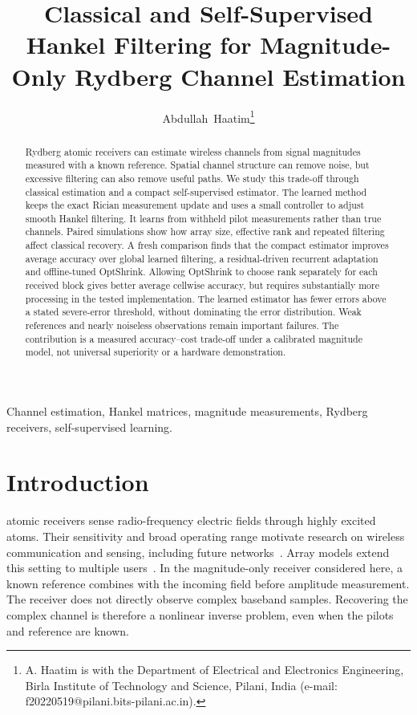 \documentclass[10pt,journal,letterpaper]{IEEEtran}
\begin{document}
\title{Classical and Self-Supervised Hankel Filtering for Magnitude-Only Rydberg Channel Estimation}
\author{Abdullah~Haatim\thanks{A. Haatim is with the Department of Electrical and Electronics Engineering, Birla Institute of Technology and Science, Pilani, India (e-mail: f20220519@pilani.bits-pilani.ac.in).}}
\maketitle
\begin{abstract}
Rydberg atomic receivers can estimate wireless channels from signal magnitudes measured with a known reference. Spatial channel structure can remove noise, but excessive filtering can also remove useful paths. We study this trade-off through classical estimation and a compact self-supervised estimator. The learned method keeps the exact Rician measurement update and uses a small controller to adjust smooth Hankel filtering. It learns from withheld pilot measurements rather than true channels. Paired simulations show how array size, effective rank and repeated filtering affect classical recovery. A fresh comparison finds that the compact estimator improves average accuracy over global learned filtering, a residual-driven recurrent adaptation and offline-tuned OptShrink. Allowing OptShrink to choose rank separately for each received block gives better average cellwise accuracy, but requires substantially more processing in the tested implementation. The learned estimator has fewer errors above a stated severe-error threshold, without dominating the error distribution. Weak references and nearly noiseless observations remain important failures. The contribution is a measured accuracy--cost trade-off under a calibrated magnitude model, not universal superiority or a hardware demonstration.
\end{abstract}
\begin{IEEEkeywords}
Channel estimation, Hankel matrices, magnitude measurements, Rydberg receivers, self-supervised learning.
\end{IEEEkeywords}

\section{Introduction}
 atomic receivers sense radio-frequency electric fields through highly excited atoms. Their sensitivity and broad operating range motivate research on wireless communication and sensing, including future networks~\cite{gong2025mag}. Array models extend this setting to multiple users~\cite{cui2025}. In the magnitude-only receiver considered here, a known reference combines with the incoming field before amplitude measurement. The receiver does not directly observe complex baseband samples. Recovering the complex channel is therefore a nonlinear inverse problem, even when the pilots and reference are known.
\end{document}
